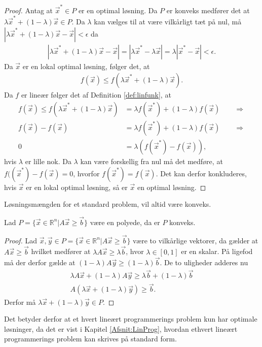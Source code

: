 \begin{proof}
Antag at $\vec{x}^* \in P$ er en optimal løsning.
Da $P$ er konveks medfører det at $\lambda \vec{x}^* + (1-\lambda)\vec{x} \in P$. 
Da $\lambda$ kan vælges til at være vilkårligt tæt på nul, må $|\lambda \vec{x}^* + (1-\lambda)\vec{x} - \vec{x}| < \epsilon$ da
\begin{align*}
 |\lambda \vec{x}^* + (1-\lambda)\vec{x} - \vec{x}| = | \lambda \vec{x}^* - \lambda\vec{x}| = \lambda|\vec{x}^* - \vec{x}| < \epsilon.
\end{align*}
Da $\vec{x}$ er en lokal optimal løsning, følger det, at
\begin{align*}
f(\vec{x}) \leq f(\lambda \vec{x}^* + (1-\lambda)\vec{x}).
\end{align*}
Da $f$ er lineær følger det af Definition \ref{def:linfunk}, at 
\begin{align*}
f(\vec{x}) \leq f(\lambda \vec{x}^* + (1-\lambda)\vec{x}) &= \lambda f(\vec{x}^*) + (1-\lambda)f(\vec{x}) \qquad \Rightarrow
\\ f(\vec{x}) - f(\vec{x}) &=\lambda f(\vec{x}^*) + (1-\lambda)f(\vec{x}) \qquad \Rightarrow
\\ 0 & = \lambda( f(\vec{x}^*) - f(\vec{x})),
\end{align*}
hvis $\lambda$ er lille nok.
Da $ \lambda$ kan være forskellig fra nul må det medføre, at $f((\vec{x}^*) - f(\vec{x}) = 0$, hvorfor $f(\vec{x}^*) =f(\vec{x})$. 
Det kan derfor konkluderes, hvis $\vec{x}$ er en lokal optimal løsning, så er $\vec{x}$ en optimal løsning.
\end{proof}
Løsningsmængden  for et standard problem, vil altid være konveks.
\begin{stn}
Lad $P =\{ \vec{x} \in \mathds{R}^n | A \vec{x} \geq \vec{b}\} $ være en polyede, da er $P$ konveks.
\label{stn:polykon}
\end{stn}
\begin{proof}
Lad $\vec{x}, \vec{y} \in P=\{ \vec{x} \in \mathds{R}^n | A \vec{x} \geq \vec{b}\}$ være to vilkårlige vektorer, da gælder at $A\vec{x} \geq \vec{b}$ hvilket medfører at $\lambda A \vec{x} \geq \lambda\vec{b}$, hvor $\lambda \in [0,1]$ er en skalar. 
På ligefod må der derfor gælde at $(1-\lambda)A\vec{y} \geq (1-\lambda)\vec{b}$.
De to uligheder adderes nu
\begin{align*}
\lambda A \vec{x} + (1-\lambda) A \vec{y} \geq \lambda \vec{b} + (1 - \lambda) \vec{b}
\\  A (\lambda\vec{x} + (1-\lambda)\vec{y}) \geq \vec{b}.
\end{align*}
Derfor må $\lambda\vec{x} + (1-\lambda)\vec{y} \in P$.
\end{proof}
Det betyder derfor at et hvert lineært programmerings problem kun har optimale løsninger, da det er vist i Kapitel \ref{Afsnit:LinProg}, hvordan ethvert lineært programmerings problem kan skrives på standard form.

